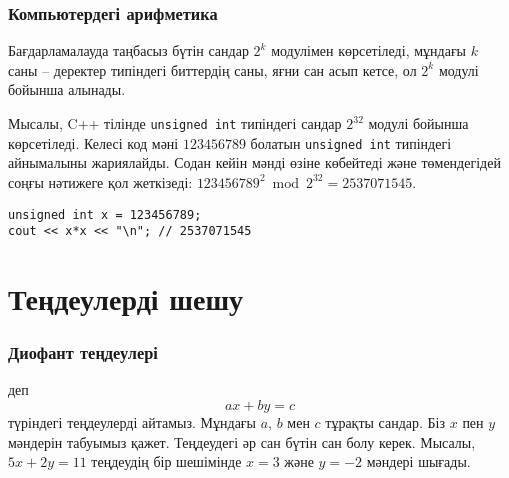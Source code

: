 \subsubsection{Компьютердегі арифметика}

Бағдарламалауда таңбасыз бүтін сандар $2^k$ модулімен көрсетіледі,
мұндағы $k$ саны -- деректер типіндегі биттердің саны, яғни сан асып кетсе, ол $2^k$ модулі бойынша алынады. 


Мысалы, C++ тілінде \texttt{unsigned int} типіндегі сандар
$2^{32}$ модулі бойынша көрсетіледі.
Келесі код мәні $123456789$ болатын 
\texttt{unsigned int} типіндегі айнымалыны
жариялайды.
Содан кейін мәнді өзіне көбейтеді және төмендегідей соңғы нәтижеге қол жеткізеді:
$123456789^2 \bmod 2^{32} = 2537071545$.

\begin{lstlisting}
unsigned int x = 123456789;
cout << x*x << "\n"; // 2537071545
\end{lstlisting}

\section{Теңдеулерді шешу}

\subsubsection*{Диофант теңдеулері}


 деп
\[ ax + by = c \] түріндегі теңдеулерді айтамыз. Мұндағы 
$a$, $b$ мен $c$ тұрақты сандар. Біз $x$ пен $y$ мәндерін табуымыз қажет.
Теңдеудегі әр сан бүтін сан болу керек.
Мысалы, $5x+2y=11$ теңдеудің бір шешімінде 
$x=3$ және $y=-2$ мәндері шығады.

